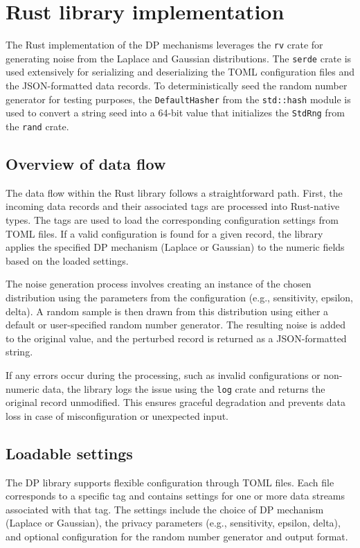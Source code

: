 \section{Rust library implementation}

The Rust implementation of the DP mechanisms leverages the \texttt{rv} crate for generating noise from the Laplace and Gaussian distributions. The \texttt{serde} crate is used extensively for serializing and deserializing the TOML configuration files and the JSON-formatted data records. To deterministically seed the random number generator for testing purposes, the \texttt{DefaultHasher} from the \texttt{std::hash} module is used to convert a string seed into a 64-bit value that initializes the \texttt{StdRng} from the \texttt{rand} crate.

\subsection{Overview of data flow}
The data flow within the Rust library follows a straightforward path. First, the incoming data records and their associated tags are processed into Rust-native types. The tags are used to load the corresponding configuration settings from TOML files. If a valid configuration is found for a given record, the library applies the specified DP mechanism (Laplace or Gaussian) to the numeric fields based on the loaded settings.

The noise generation process involves creating an instance of the chosen distribution using the parameters from the configuration (e.g., sensitivity, epsilon, delta). A random sample is then drawn from this distribution using either a default or user-specified random number generator. The resulting noise is added to the original value, and the perturbed record is returned as a JSON-formatted string.

If any errors occur during the processing, such as invalid configurations or non-numeric data, the library logs the issue using the \texttt{log} crate and returns the original record unmodified. This ensures graceful degradation and prevents data loss in case of misconfiguration or unexpected input.

\subsection{Loadable settings}
The DP library supports flexible configuration through TOML files. Each file corresponds to a specific tag and contains settings for one or more data streams associated with that tag. The settings include the choice of DP mechanism (Laplace or Gaussian), the privacy parameters (e.g., sensitivity, epsilon, delta), and optional configuration for the random number generator and output format.

